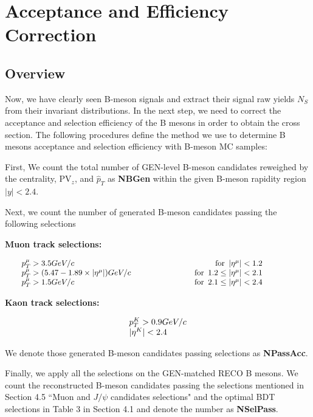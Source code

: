 \section{Acceptance and Efficiency Correction} 

\subsection{Overview}

Now, we have clearly seen B-meson signals and extract their signal raw yields $N_S$ from their invariant distributions. In the next step, we need to correct the acceptance and selection efficiency of the B mesons in order to obtain the cross section. The following procedures define the method we use to determine B mesons acceptance and selection efficiency with B-meson MC samples:

First, We count the total number of GEN-level B-meson candidates reweighed by the centrality, PV$_{z}$, and $\hat p_T$ as \textbf{NBGen} within the given B-meson rapidity region $|y| < 2.4$.

Next, we count the number of generated B-meson candidates passing the following selections

\textbf{Muon track selections:}

\begin{equation}
\centering
\setlength\arraycolsep{20pt}
\begin{array}{l c r r}
p_T^{\mu}>3.5 GeV/c & & \text{for}\enspace |\eta^{\mu}|<1.2 & \\
p_T^{\mu}>(5.47 - 1.89\times |\eta^{\mu}|) GeV/c & &  \text{for}\enspace 1.2\le |\eta^{\mu}|<2.1 &\\
p_T^{\mu}>1.5 GeV/c & & \text{for}\enspace 2.1\le |\eta^{\mu}|<2.4 &
\end{array}
\label{eq:SingleMuonAccCuts}
\end{equation}


\textbf{Kaon track selections:}

\begin{equation}
\centering
\setlength\arraycolsep{20pt}
\begin{array}{l c r r}
p_T^{K}>0.9 GeV/c \\
|\eta^{K}| < 2.4
\end{array}
\label{eq:KaonTrackCut}
\end{equation}

We denote those generated B-meson candidates passing selections as \textbf{NPassAcc}.


Finally, we apply all the selections on the GEN-matched RECO B mesons. We count the reconstructed B-meson candidates passing the selections mentioned in Section 4.5 ``Muon and $J/\psi$ candidates selections" and the optimal BDT selections in Table 3 in Section 4.1 and denote the number as \textbf{NSelPass}.

